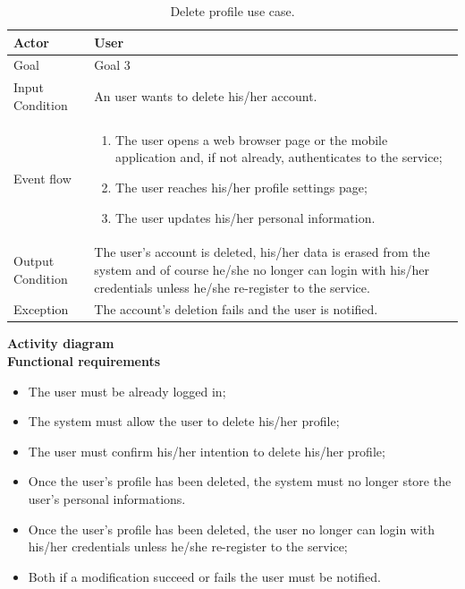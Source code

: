 \documentclass{article}
\begin{document}
	\begin{table}[htp]
	\caption{Delete profile use case.}
		\begin{center}
    			\begin{tabular}{p{}|p{}}

   			 	\hline
    				Actor & User \\ \hline
    				Goal & Goal 3 \\ \hline
    				Input Condition & An user wants to delete his/her account. \\ \hline
    				Event flow & 
				\begin{enumerate}
  					\item The user opens a web browser page or the mobile application and, if not already, authenticates to the service;
  					\item The user reaches his/her profile settings page;
  					\item The user updates his/her personal information.
 				 \end{enumerate} \\ \hline
    				Output Condition & The user's account is deleted, his/her data is erased from the system and of course he/she no longer can login with his/her credentials unless he/she re-register to the service. \\ \hline
    				Exception & The account's deletion fails and the user is notified. \\
    				\hline
    			\end{tabular}
		\end{center}
	\end{table}
	
	\bigskip
	\noindent
	\textbf{Activity diagram} \\
	
	
	\bigskip
	\noindent
	\textbf{Functional requirements} \\
	\begin{itemize}
		\item The user must be already logged in;
		\item The system must allow the user to delete his/her profile;
		\item The user must confirm his/her intention to delete his/her profile;
		\item Once the user's profile has been deleted, the system must no longer store the user's personal informations.
		\item Once the user's profile has been deleted, the user no longer can login with his/her credentials unless he/she re-register to the service;
		\item Both if a modification succeed or fails the user must be notified.
	\end{itemize}
	
\end{document}
